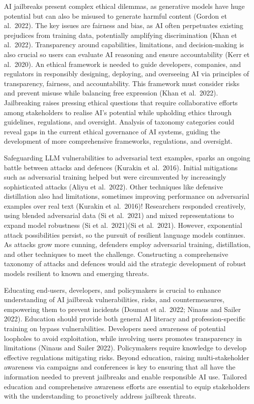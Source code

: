 \documentclass[
  letterpaper,
  DIV=11,
  numbers=noendperiod]{scrartcl}
\begin{document}
AI jailbreaks present complex ethical dilemmas, as generative models
have huge potential but can also be misused to generate harmful content
(Gordon et al.~2022). The key issues are fairness and bias, as AI often
perpetuates existing prejudices from training data, potentially
amplifying discrimination (Khan et al.~2022). Transparency around
capabilities, limitations, and decision-making is also crucial so users
can evaluate AI reasoning and ensure accountability (Kerr et al.~2020).
An ethical framework is needed to guide developers, companies, and
regulators in responsibly designing, deploying, and overseeing AI via
principles of transparency, fairness, and accountability. This framework
must consider risks and prevent misuse while balancing free expression
(Khan et al.~2022). Jailbreaking raises pressing ethical questions that
require collaborative efforts among stakeholders to realise AI's
potential while upholding ethics through guidelines, regulations, and
oversight. Analysis of taxonomy categories could reveal gaps in the
current ethical governance of AI systems, guiding the development of
more comprehensive frameworks, regulations, and oversight.

Safeguarding LLM vulnerabilities to adversarial text examples, sparks an
ongoing battle between attacks and defences (Kurakin et al.~2016).
Initial mitigations such as adversarial training helped but were
circumvented by increasingly sophisticated attacks (Aliyu et al.~2022).
Other techniques like defensive distillation also had limitations,
sometimes improving performance on adversarial examples over real text
(Kurakin et al.~2016)! Researchers responded creatively, using blended
adversarial data (Si et al.~2021) and mixed representations to expand
model robustness (Si et al.~2021)(Si et al.~2021). However, exponential
attack possibilities persist, so the pursuit of resilient language
models continues. As attacks grow more cunning, defenders employ
adversarial training, distillation, and other techniques to meet the
challenge. Constructing a comprehensive taxonomy of attacks and defences
would aid the strategic development of robust models resilient to known
and emerging threats.

Educating end-users, developers, and policymakers is crucial to enhance
understanding of AI jailbreak vulnerabilities, risks, and
countermeasures, empowering them to prevent incidents (Doumat et
al.~2022; Ninaus and Sailer 2022). Education should provide both general
AI literacy and profession-specific training on bypass vulnerabilities.
Developers need awareness of potential loopholes to avoid exploitation,
while involving users promotes transparency in limitations (Ninaus and
Sailer 2022). Policymakers require knowledge to develop effective
regulations mitigating risks. Beyond education, raising
multi-stakeholder awareness via campaigns and conferences is key to
ensuring that all have the information needed to prevent jailbreaks and
enable responsible AI use. Tailored education and comprehensive
awareness efforts are essential to equip stakeholders with the
understanding to proactively address jailbreak threats.
\end{document}
